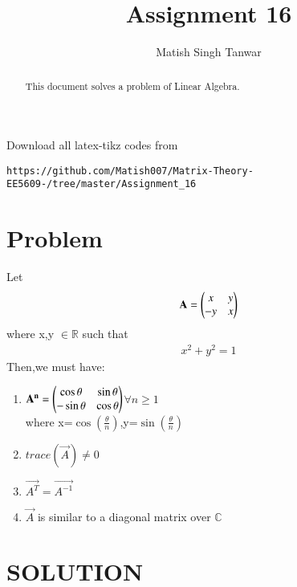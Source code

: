 \documentclass[journal,12pt,twocolumn]{IEEEtran}
\begin{document}
 \vspace{3cm}
 \title{Assignment 16}
 \author{Matish Singh Tanwar}
 \maketitle
 \newpage
 \bigskip
 \renewcommand{\thetable}{\theenumi}
\vspace{1.0cm}
\begin{abstract}
This document solves a problem of Linear Algebra.
\end{abstract}
\vspace{0.5cm}
%
Download all latex-tikz codes from 
\begin{lstlisting}
https://github.com/Matish007/Matrix-Theory-EE5609-/tree/master/Assignment_16
\end{lstlisting}
%
%
\vspace{0.5mm}
\section{Problem}
Let
\begin{align}
    \mathbf{A}=\begin{pmatrix}x&y\\-y&x\end{pmatrix}\label{1}
\end{align}
where x,y $\in \mathbb{R}$ such that
\begin{align}
    x^{2}+y^{2}=1
\end{align}
Then,we must have:
\begin{enumerate}
\item{$\mathbf{A^{n}}=\begin{pmatrix}\cos\theta& \sin\theta\\-\sin\theta& \cos\theta\end{pmatrix}$$\forall n\geq{1}$\\ where x=$\cos(\frac{\theta}{n})$,y=$\sin(\frac{\theta}{n})$}
\item{$trace(\vec{A})\neq 0$}
\item{$\vec{A^{T}}=\vec{A^{-1}}$}
\item{$\vec{A}$ is similar to a diagonal matrix over $\mathbb{C}$}
\end{enumerate}
\section{SOLUTION}
\end{document}
